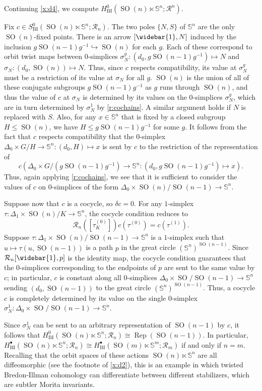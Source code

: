 \documentclass[12pt,reqno]{amsart}
\newcommand{\printname}[1]{}
\renewcommand{\printname}[1]
	{{\color{brown}{\makebox[0pt]{\hspace{-1in}\raisebox{8pt}{\tiny #1}}}}}
\newcommand{\labell}[1]{\label{#1} \printname{#1}}
\newcommand{\calR}{{\mathcal{R}}}
\renewcommand{\SS}{{\mathbb{S}}} %
\newcommand{\Rep}{{\operatorname{Rep}}} %
\newcommand{\SO}{{\operatorname{SO}}}  %
\theoremstyle{plain}
\theoremstyle{definition}
\newenvironment{example}
		{\pushQED{\qed}\renewcommand{\qedsymbol}{$/\!\!/$}\examplex}
		{\popQED\endexamplex}
\newcommand{\BI}{{\operatorname{BI}}} %
\begin{document}
    \begin{example}[{\bf Groupoid D}]\labell{x:d5}
        Continuing \cref{x:d4}, we compute $H^0_\BI(\SO(n)\ltimes\SS^n;\calR^n)$.  
               
        Fix $c\in S^0_\BI(\SO(n)\ltimes\SS^n;\calR_n)$.
        The two poles $\{N,S\}$ of $\SS^n$ are the only $\SO(n)$-fixed points.  There is an arrow $[\widebar{1},N]$ induced by the inclusion $g\SO(n-1)g^{-1}\hookrightarrow\SO(n)$ for each $g$.  Each of these correspond to orbit twist maps between $0$-simplices $\sigma^g_N\colon(d_0,g\SO(n-1)g^{-1})\mapsto N$ and $\sigma_N\colon(d_0,\SO(n))\mapsto N$.  Thus, since $c$ respects compatibility, its value at $\sigma_N^g$ must be a restriction of its value at $\sigma_N$ for all $g$.   $\SO(n)$ is the union of all of these conjugate subgroups $g\SO(n-1)g^{-1}$ as $g$ runs through $\SO(n)$, and thus the value of $c$ at $\sigma_N$ is determined by its values on the $0$-simplices $\sigma^g_N$, which are in turn determined by $\sigma^1_N$ by \cref{r:cochains}.  A similar argument holds if $N$ is replaced with $S$.  Also, for any $x\in\SS^n$ that is fixed by a closed subgroup $H\leq\SO(n)$, we have $H\leq g\SO(n-1)g^{-1}$ for some $g$.  It follows from the fact that $c$ respects compatibility that the $0$-simplex $\Delta_0\times G/H\to \SS^n\colon (d_0,H)\mapsto x$ is sent by $c$ to the restriction of the representation of $$c(\Delta_0\times G/(g\SO(n-1)g^{-1})\to\SS^n\colon (d_0,g\SO(n-1)g^{-1})\mapsto x).$$ Thus, again applying \cref{r:cochains}, we see that it is sufficient to consider the values of $c$ on $0$-simplices of the form $\Delta_0\times\SO(n)/\SO(n-1)\to\SS^n$.

        Suppose now that $c$ is a cocycle, so $\delta c=0$.  For any $1$-simplex $\tau\colon\Delta_1\times\SO(n)/K\to\SS^n$, the cocycle condition reduces to $$\calR_n\!\left([\tau^{(0)}_K]\right)c(\tau^{(0)})=c(\tau^{(1)}).$$
        Suppose $\tau\colon\Delta_1\times\SO(n)/\SO(n-1)\to\SS^n$ is a $1$-simplex such that $u\mapsto\tau(u,\SO(n-1))$ is a path $p$ in the great circle $(\SS^n)^{\SO(n-1)}$.  Since $\calR_n[\widebar{1},p]$ is the identity map, the cocycle condition guarantees that the $0$-simplices corresponding to the endpoints of $p$ are sent to the same value by $c$; in particular, $c$ is constant along all $0$-simplices $\Delta_0\times\SO/\SO(n-1)\to\SS^n$ sending $(d_0,\SO(n-1))$ to the great circle $(\SS^n)^{\SO(n-1)}$.  Thus, a cocycle $c$ is completely determined by its value on the single $0$-simplex $\sigma^1_N\colon\Delta_0\times\SO/\SO(n-1)\to\SS^n$.
      
       Since $\sigma^1_N$ can be sent to an arbitrary representation of $\SO(n-1)$ by $c$, it follows that $H^0_\BI(\SO(n)\ltimes\SS^n;\calR_n)\cong\Rep(\SO(n-1))$.  In particular, $H^\bullet_\BI(\SO(n)\ltimes\SS^n;\calR_n)\cong H^\bullet_\BI(\SO(m)\ltimes\SS^m;\calR_m)$ if and only if $n=m$.  Recalling that the orbit spaces of these actions $\SO(n)\ltimes\SS^n$ are all diffeomorphic (see the footnote of \cref{x:d2}), this is an example in which twisted Bredon-Illman cohomology can differentiate between different stabilizers, which are subtler Morita invariants.
    \end{example}


\printbibliography
\end{document}
